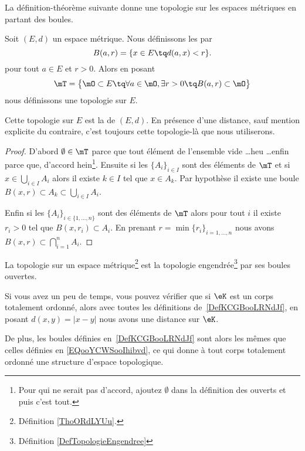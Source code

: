 La définition-théorème suivante donne une topologie sur les espaces métriques en partant des boules.

\begin{theoremDef}     \label{ThoORdLYUu}
	Soit \( (E,d)\) un espace métrique. Nous définissons les  par
	\begin{equation}        \label{EQooYCWSooIhibvd}
		B(a,r)=\{ x\in E\tq d(a,x)<r \}.
	\end{equation}
	pour tout \( a\in E\) et \( r>0\).
	Alors en posant
	\begin{equation}        \label{EqGDVVooDZfwSf}
		\mT=\big\{  \mO\subset E  \tq\forall a\in \mO,\exists r>0\tq B(a,r)\subset \mO \big\}
	\end{equation}
	nous définissons une topologie sur \( E\).

	Cette topologie sur \( E\) est la  de \( (E,d)\). En présence d'une distance, sauf mention explicite du contraire, c'est toujours cette topologie-là que nous utiliserons.
\end{theoremDef}

\begin{proof}
	D'abord \( \emptyset\in\mT\) parce que tout élément de l'ensemble vide \ldots heu \ldots enfin parce que, d'accord hein\footnote{Pour qui ne serait pas d'accord, ajoutez \( \emptyset\) dans la définition des ouverts et puis c'est tout.}. Ensuite si les \( \{A_i\}_{i\in I}\) sont des éléments de \( \mT\) et si \( x\in\bigcup_{i\in I}A_i\) alors il existe \( k\in I\) tel que \( x\in A_k\). Par hypothèse il existe une boule \( B(x,r)\subset A_k\subset\bigcup_{i\in I}A_i\).

	Enfin si les \( \{A_i\}_{i\in\{ 1,\ldots, n \}}\) sont des éléments de \( \mT\) alors pour tout \( i\) il existe \( r_i>0\) tel que \( B(x,r_i)\subset A_i\). En prenant \( r=\min\{ r_i \}_{i=1,\ldots, n}\) nous avons \( B(x,r)\subset\bigcap_{i=1}^nA_i.\)
\end{proof}

\begin{proposition}     \label{PROPooZXTXooEMLgMn}
	La topologie sur un espace métrique\footnote{Définition \ref{ThoORdLYUu}.} est la topologie engendrée\footnote{Définition \ref{DefTopologieEngendree}} par ses boules ouvertes.
\end{proposition}

\begin{normaltext}      \label{NORMooJBMXooLHfAJK}
	Si vous avez un peu de temps, vous pouvez vérifier que si \( \eK\) est un corps totalement ordonné, alors avec toutes les définitions de~\ref{DefKCGBooLRNdJf}, en posant \( d(x,y)=| x-y |\) nous avons une distance sur \( \eK\).

	De plus, les boules définies en~\ref{DefKCGBooLRNdJf} sont alors les mêmes que celles définies en \eqref{EQooYCWSooIhibvd}, ce qui donne à tout corps totalement ordonné une structure d'espace topologique.
\end{normaltext}


